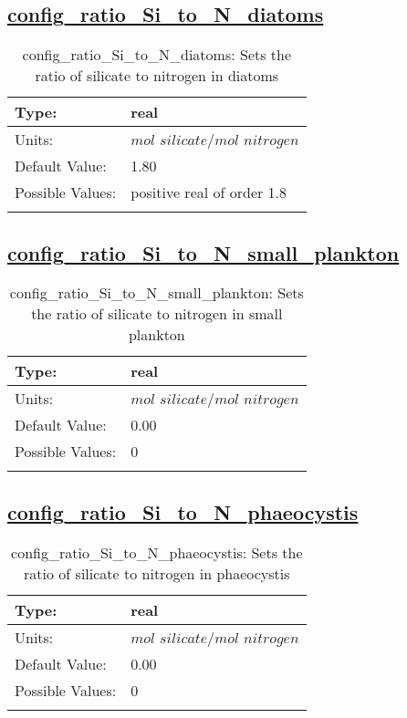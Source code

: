 \subsection[config\_ratio\_Si\_to\_N\_diatoms]{\hyperref[sec:nm_tab_biogeochemistry]{config\_ratio\_Si\_to\_N\_diatoms}}
\label{subsec:nm_sec_config_ratio_Si_to_N_diatoms}
\begin{center}
\begin{longtable}{| p{2.0in} || p{4.0in} |}
    \hline
    Type: & real \\
    \hline
    Units: & $mol$ $silicate/mol$ $nitrogen$ \\
    \hline
    Default Value: & 1.80 \\
    \hline
    Possible Values: & positive real of order 1.8 \\
    \hline
    \caption{config\_ratio\_Si\_to\_N\_diatoms: Sets the ratio of silicate to nitrogen in diatoms}
\end{longtable}
\end{center}
\subsection[config\_ratio\_Si\_to\_N\_small\_plankton]{\hyperref[sec:nm_tab_biogeochemistry]{config\_ratio\_Si\_to\_N\_small\_plankton}}
\label{subsec:nm_sec_config_ratio_Si_to_N_small_plankton}
\begin{center}
\begin{longtable}{| p{2.0in} || p{4.0in} |}
    \hline
    Type: & real \\
    \hline
    Units: & $mol$ $silicate/mol$ $nitrogen$ \\
    \hline
    Default Value: & 0.00 \\
    \hline
    Possible Values: & 0 \\
    \hline
    \caption{config\_ratio\_Si\_to\_N\_small\_plankton: Sets the ratio of silicate to nitrogen in small plankton}
\end{longtable}
\end{center}
\subsection[config\_ratio\_Si\_to\_N\_phaeocystis]{\hyperref[sec:nm_tab_biogeochemistry]{config\_ratio\_Si\_to\_N\_phaeocystis}}
\label{subsec:nm_sec_config_ratio_Si_to_N_phaeocystis}
\begin{center}
\begin{longtable}{| p{2.0in} || p{4.0in} |}
    \hline
    Type: & real \\
    \hline
    Units: & $mol$ $silicate/mol$ $nitrogen$ \\
    \hline
    Default Value: & 0.00 \\
    \hline
    Possible Values: & 0 \\
    \hline
    \caption{config\_ratio\_Si\_to\_N\_phaeocystis: Sets the ratio of silicate to nitrogen in phaeocystis}
\end{longtable}
\end{center}
